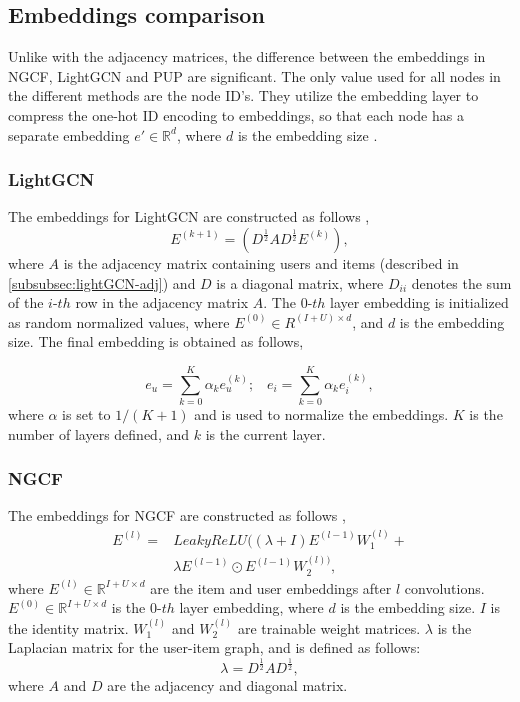 \subsection{Embeddings comparison}
Unlike with the adjacency matrices, the difference between the embeddings in NGCF, LightGCN and PUP are significant.
The only value used for all nodes in the different methods are the node ID's.
They utilize the embedding layer to compress the one-hot ID encoding to embeddings, so that each node has a separate embedding $e' \in \mathbb{R}^d$, where $d$ is the embedding size \cite{Priceaware,lightgcn}.

\subsubsection{LightGCN}\label{subsubsec:lightgcn-embedding}
The embeddings for LightGCN are constructed as follows \cite{lightgcn},
\begin{equation}
    E^{(k+1)} = (D^{\frac{1}{2}}AD^{\frac{1}{2}}E^{(k)}),
\end{equation}
where $A$ is the adjacency matrix containing users and items (described in \autoref{subsubsec:lightGCN-adj}) and $D$ is a diagonal matrix, where $D_{ii}$ denotes the sum of the $i$-$th$ row in the adjacency matrix $A$.
The $0$-$th$ layer embedding is initialized as random normalized values, where $E^{(0)} \in R^{(I + U)\times d}$, and $d$ is the embedding size.
The final embedding is obtained as follows,

\begin{equation}
    e_u = \sum_{k=0}^{K} \alpha_k e_u^{(k)};\;\;\; e_i = \sum_{k=0}^{K} \alpha_k e_i^{(k)},
\end{equation}
where $\alpha$ is set to $1/(K + 1)$ and is used to normalize the embeddings.
$K$ is the number of layers defined, and $k$ is the current layer.

\subsubsection{NGCF}\label{subsubsec:NGCF-embed}
The embeddings for NGCF are constructed as follows \cite{NGCF_2019},
\begin{equation}
    \begin{split}
        E^{(l)} = &LeakyReLU((\lambda + I)E^{(l-1)}W_1^{(l)}+\\
        & \lambda E^{(l-1)}\odot E^{(l-1)}W_2^{(l))},
    \end{split}
\end{equation}
where $E^{(l)} \in \mathbb{R}^{I+U \times d}$ are the item and user embeddings after $l$ convolutions.
$E^{(0)} \in \mathbb{R}^{I+U \times d}$ is the $0$-$th$ layer embedding, where $d$ is the embedding size.
$I$ is the identity matrix.
$W_1^{(l)}$ and $W_2^{(l)}$ are trainable weight matrices.
$\lambda$ is the Laplacian matrix for the user-item graph, and is defined as follows:
\begin{equation}
    \lambda = D^{\frac{1}{2}}AD^{\frac{1}{2}},
\end{equation}
where $A$ and $D$ are the adjacency and diagonal matrix.

